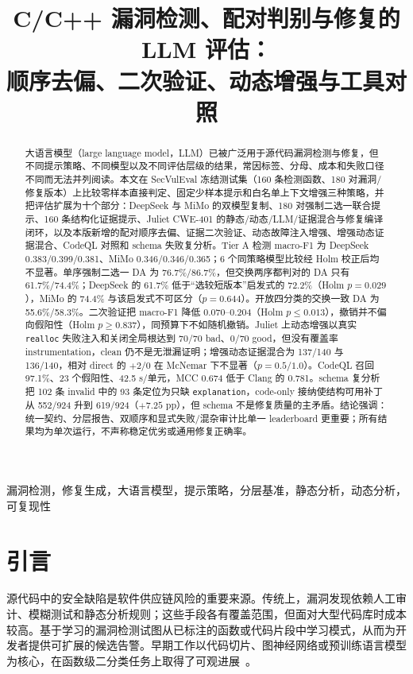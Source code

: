 \documentclass[conference]{IEEEtran}
\title{C/C++ 漏洞检测、配对判别与修复的 LLM 评估：\\顺序去偏、二次验证、动态增强与工具对照}
\author{
\IEEEauthorblockN{Yu Zhang}
\IEEEauthorblockA{CS224 课程项目\\
ShanghaiTech University\\
Shanghai, China\\
\href{mailto:Zhangyu12026@shanghaitech.edu.cn}{Zhangyu12026@shanghaitech.edu.cn}}
}
\begin{document}
\maketitle

\begin{abstract}
大语言模型（large language model，LLM）已被广泛用于源代码漏洞检测与修复，但不同提示策略、不同模型以及不同评估层级的结果，常因标签、分母、成本和失败口径不同而无法并列阅读。本文在 SecVulEval 冻结测试集（160 条检测函数、180 对漏洞/修复版本）上比较零样本直接判定、固定少样本提示和白名单上下文增强三种策略，并把评估扩展为十个部分：DeepSeek 与 MiMo 的双模型复制、180 对强制二选一联合提示、160 条结构化证据提示、Juliet CWE-401 的静态/动态/LLM/证据混合与修复编译闭环，以及本版新增的配对顺序去偏、证据二次验证、动态故障注入增强、增强动态证据混合、CodeQL 对照和 schema 失败复分析。Tier A 检测 macro-F1 为 DeepSeek 0.383/0.399/0.381、MiMo 0.346/0.346/0.365；6 个同策略模型比较经 Holm 校正后均不显著。单序强制二选一 DA 为 76.7\%/86.7\%，但交换两序都判对的 DA 只有 61.7\%/74.4\%；DeepSeek 的 61.7\% 低于“选较短版本”启发式的 72.2\%（Holm $p=0.029$），MiMo 的 74.4\% 与该启发式不可区分（$p=0.644$）。开放四分类的交换一致 DA 为 55.6\%/58.3\%。二次验证把 macro-F1 降低 0.070--0.204（Holm $p\le0.013$），撤销并不偏向假阳性（Holm $p\ge0.837$），同预算下不如随机撤销。Juliet 上动态增强以真实 \texttt{realloc} 失败注入和关闭全局根达到 70/70 bad、0/70 good，但没有覆盖率 instrumentation，clean 仍不是无泄漏证明；增强动态证据混合为 137/140 与 136/140，相对 direct 的 $+2/0$ 在 McNemar 下不显著（$p=0.5/1.0$）。CodeQL 召回 97.1\%、23 个假阳性、42.5 s/单元，MCC 0.674 低于 Clang 的 0.781。schema 复分析把 102 条 invalid 中的 93 条定位为只缺 \texttt{explanation}，code-only 接纳使结构可用补丁从 552/924 升到 619/924（$+7.25$ pp），但 schema 不是修复质量的主矛盾。结论强调：统一契约、分层报告、双顺序和显式失败/混杂审计比单一 leaderboard 更重要；所有结果均为单次运行，不声称稳定优劣或通用修复正确率。
\end{abstract}

\begin{IEEEkeywords}
漏洞检测，修复生成，大语言模型，提示策略，分层基准，静态分析，动态分析，可复现性
\end{IEEEkeywords}

\section{引言}
\label{sec:intro}
源代码中的安全缺陷是软件供应链风险的重要来源。传统上，漏洞发现依赖人工审计、模糊测试和静态分析规则；这些手段各有覆盖范围，但面对大型代码库时成本较高。基于学习的漏洞检测试图从已标注的函数或代码片段中学习模式，从而为开发者提供可扩展的候选告警。早期工作以代码切片、图神经网络或预训练语言模型为核心，在函数级二分类任务上取得了可观进展~\cite{li2018vuldeepecker,zhou2019devign,feng2020codebert,fu2022linevul}。
\end{document}
